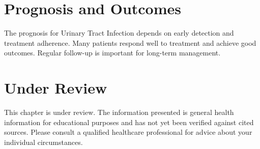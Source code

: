 \section*{Prognosis and Outcomes}
The prognosis for Urinary Tract Infection depends on early detection and treatment adherence. Many patients respond well to treatment and achieve good outcomes. Regular follow-up is important for long-term management.
\section*{Under Review}
This chapter is under review. The information presented is general health information for educational purposes and has not yet been verified against cited sources. Please consult a qualified healthcare professional for advice about your individual circumstances.


\clearpage
